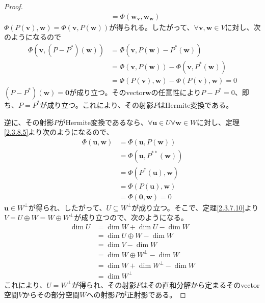 \documentclass[dvipdfmx]{jsarticle}
\begin{document}
\begin{proof}
\begin{align*}
&= \varPhi\left( \mathbf{w}_{\mathbf{v}},\mathbf{w}_{\mathbf{w}} \right)
\end{align*}
$\varPhi\left( P\left( \mathbf{v} \right),\mathbf{w} \right) = \varPhi\left( \mathbf{v},P\left( \mathbf{w} \right) \right)$が得られる。したがって、$\forall\mathbf{v},\mathbf{w} \in V$に対し、次のようになるので
\begin{align*}
\varPhi\left( \mathbf{v},\left( P - P^{*} \right)\left( \mathbf{w} \right) \right) &= \varPhi\left( \mathbf{v},P\left( \mathbf{w} \right) - P^{*}\left( \mathbf{w} \right) \right)\\
&= \varPhi\left( \mathbf{v},P\left( \mathbf{w} \right) \right) - \varPhi\left( \mathbf{v},P^{*}\left( \mathbf{w} \right) \right)\\
&= \varPhi\left( P\left( \mathbf{v} \right),\mathbf{w} \right) - \varPhi\left( P\left( \mathbf{v} \right),\mathbf{w} \right) = 0
\end{align*}
$\left( P - P^{*} \right)\left( \mathbf{w} \right) = \mathbf{0}$が成り立つ。そのvector$\mathbf{w}$の任意性により$P - P^{*} = 0$、即ち、$P = P^{*}$が成り立つ。これにより、その射影$P$はHermite変換である。\par
逆に、その射影$P$がHermite変換であるなら、$\forall\mathbf{u} \in U\forall\mathbf{w} \in W$に対し、定理\ref{2.3.8.5}より次のようになるので、
\begin{align*}
\varPhi\left( \mathbf{u},\mathbf{w} \right) &= \varPhi\left( \mathbf{u},P\left( \mathbf{w} \right) \right)\\
&= \varPhi\left( \mathbf{u},P^{**}\left( \mathbf{w} \right) \right)\\
&= \varPhi\left( P^{*}\left( \mathbf{u} \right),\mathbf{w} \right)\\
&= \varPhi\left( P\left( \mathbf{u} \right),\mathbf{w} \right)\\
&= \varPhi\left( \mathbf{0},\mathbf{w} \right) = 0
\end{align*}
$\mathbf{u} \in W^{\bot}$が得られ、したがって、$U \subseteq W^{\bot}$が成り立つ。そこで、定理\ref{2.3.7.10}より$V = U \oplus W = W \oplus W^{\bot}$が成り立つので、次のようになる。
\begin{align*}
\dim U &= \dim W + \dim U - \dim W\\
&= \dim{U \oplus W} - \dim W\\
&= \dim V - \dim W\\
&= \dim{W \oplus W^{\bot}} - \dim W\\
&= \dim W + \dim W^{\bot} - \dim W\\
&= \dim W^{\bot}
\end{align*}
これにより、$U = W^{\bot}$が得られ、その射影$P$はその直和分解から定まるそのvector空間$V$からその部分空間$W$への射影$P$が正射影である。
\end{proof}\par
\end{document}
